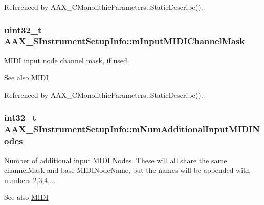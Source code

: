 Referenced by A\+A\+X\+\_\+\+C\+Monolithic\+Parameters\+::\+Static\+Describe().

\hypertarget{a00124_acfc35506cfa94a358411aade13070109}{}
\subsubsection[{m\+Input\+M\+I\+D\+I\+Channel\+Mask}]{\setlength{\rightskip}{0pt plus 5cm}uint32\+\_\+t A\+A\+X\+\_\+\+S\+Instrument\+Setup\+Info\+::m\+Input\+M\+I\+D\+I\+Channel\+Mask}\label{a00124_acfc35506cfa94a358411aade13070109}


M\+I\+D\+I input node channel mask, if used. 

\begin{DoxySeeAlso}{See also}
\hyperlink{a00336}{M\+I\+D\+I} 
\end{DoxySeeAlso}


Referenced by A\+A\+X\+\_\+\+C\+Monolithic\+Parameters\+::\+Static\+Describe().

\hypertarget{a00124_a256b7a612ed6ff827d47d8ea5b7c0968}{}
\subsubsection[{m\+Num\+Additional\+Input\+M\+I\+D\+I\+Nodes}]{\setlength{\rightskip}{0pt plus 5cm}int32\+\_\+t A\+A\+X\+\_\+\+S\+Instrument\+Setup\+Info\+::m\+Num\+Additional\+Input\+M\+I\+D\+I\+Nodes}\label{a00124_a256b7a612ed6ff827d47d8ea5b7c0968}


Number of additional input M\+I\+D\+I Nodes. These will all share the same channel\+Mask and base M\+I\+D\+I\+Node\+Name, but the names will be appended with numbers 2,3,4,... 

\begin{DoxySeeAlso}{See also}
\hyperlink{a00336}{M\+I\+D\+I} 
\end{DoxySeeAlso}


